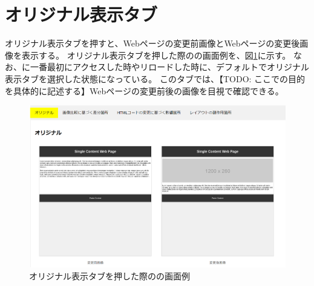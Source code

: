 \section{オリジナル表示タブ}\label{subsec:original_tab}
オリジナル表示タブを押すと、Webページの変更前画像とWebページの変更後画像を表示する。
オリジナル表示タブを押した際の\toolName の画面例を、図\ref{fig: Appearance_original_tab}に示す。
なお、\toolName に一番最初にアクセスした時やリロードした時に、デフォルトでオリジナル表示タブを選択した状態になっている。
このタブでは、【TODO: ここでの目的を具体的に記述する】Webページの変更前後の画像を目視で確認できる。
\begin{figure}[tp]
    \begin{center}
        \includegraphics[width=1.0\columnwidth]{image/3_original_tab.png}
        \caption{オリジナル表示タブを押した際の\toolName の画面例}
        \label{fig: Appearance_original_tab}
    \end{center}
\end{figure}




